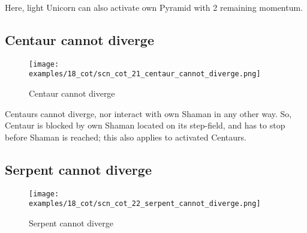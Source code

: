 Here, light Unicorn can also activate own Pyramid with 2 remaining momentum.

\clearpage %

\subsection*{Centaur cannot diverge}
\label{sec:Conquest of Tlalocan/Divergence/Centaur cannot diverge}

\vspace*{-1.4\baselineskip}
\noindent
\begin{figure}[!h]
\texttt{[image: examples/18\_cot/scn\_cot\_21\_centaur\_cannot\_diverge.png]}
\vspace*{-1.3\baselineskip}
\caption{Centaur cannot diverge}
\label{fig:scn_cot_21_centaur_cannot_diverge}
\end{figure}

\vspace*{-0.5\baselineskip}
Centaurs cannot diverge, nor interact with own Shaman in any other way. So, Centaur
is blocked by own Shaman located on its step-field, and has to stop before Shaman
is reached; this also applies to activated Centaurs.

\clearpage %

\subsection*{Serpent cannot diverge}
\label{sec:Conquest of Tlalocan/Divergence/Serpent cannot diverge}

\vspace*{-1.4\baselineskip}
\noindent
\begin{figure}[!h]
\texttt{[image: examples/18\_cot/scn\_cot\_22\_serpent\_cannot\_diverge.png]}
\vspace*{-1.3\baselineskip}
\caption{Serpent cannot diverge}
\label{fig:scn_cot_22_serpent_cannot_diverge}
\end{figure}

